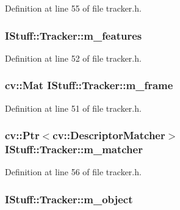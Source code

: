 Definition at line 55 of file tracker.\-h.

\hypertarget{class_i_stuff_1_1_tracker_a2e8d6c6201c9ea3a4d824404c917befe}{
\subsubsection[{m\-\_\-features}]{ I\-Stuff\-::\-Tracker\-::m\-\_\-features\hspace{0.3cm}{\ttfamily [private]}}}\label{class_i_stuff_1_1_tracker_a2e8d6c6201c9ea3a4d824404c917befe}


Definition at line 52 of file tracker.\-h.

\hypertarget{class_i_stuff_1_1_tracker_a174749550b4b79c8ddf91e9a744fb50d}{
\subsubsection[{m\-\_\-frame}]{\setlength{\rightskip}{0pt plus 5cm}cv\-::\-Mat I\-Stuff\-::\-Tracker\-::m\-\_\-frame\hspace{0.3cm}{\ttfamily [private]}}}\label{class_i_stuff_1_1_tracker_a174749550b4b79c8ddf91e9a744fb50d}


Definition at line 51 of file tracker.\-h.

\hypertarget{class_i_stuff_1_1_tracker_a126a9bea1a885a25b3fc734c96a052de}{
\subsubsection[{m\-\_\-matcher}]{\setlength{\rightskip}{0pt plus 5cm}cv\-::\-Ptr$<$cv\-::\-Descriptor\-Matcher$>$ I\-Stuff\-::\-Tracker\-::m\-\_\-matcher\hspace{0.3cm}{\ttfamily [private]}}}\label{class_i_stuff_1_1_tracker_a126a9bea1a885a25b3fc734c96a052de}


Definition at line 56 of file tracker.\-h.

\hypertarget{class_i_stuff_1_1_tracker_a1d7215169ee7adb0bb9f182c0aaaa311}{
\subsubsection[{m\-\_\-object}]{ I\-Stuff\-::\-Tracker\-::m\-\_\-object\hspace{0.3cm}{\ttfamily [private]}}}\label{class_i_stuff_1_1_tracker_a1d7215169ee7adb0bb9f182c0aaaa311}


